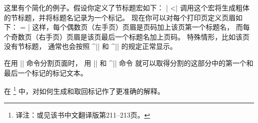 {{{{{%
这里有个简化的例子。假设你定义了节标题宏如下：
\csdisplay
\def\section#1{\medskip{\bf#1}\smallskip\mark{#1}}
|
^^|\mark|
调用这个宏将生成粗体的节标题，并将标题名记录为一个标记。
现在你可以对每个打印页定义页眉如下：
\csdisplay
\headline = {\ifodd\pageno \hfil\botmark\quad\folio
   \else \folio\quad\firstmark\hfil \fi}
|
这样，每个偶数页（左手页）页眉是页码加上该页第一个标题名，
而每个奇数页（右手页）页眉是该页最后一个标题名加上页码。
特殊情形，比如该页没有节标题，
通常也会按照 ^|\firstmark| 和 ^|\botmark| 的规定正常显示。

在用 |\vsplit| 命令\ctsref{\vsplit}分割页面时，
用 |\splitfirstmark| 和 ^|\splitbotmark| 命令\ctsref{\splitfirstmark}%
就可以取得分割的这部分中的第一个和最后一个标记的标记文本。

在
\footnote{译注：或见该书中文翻译版第211--213页。}
中，对如何生成和取回标记作了更准确的解释。
\endconcept


}}}}}
